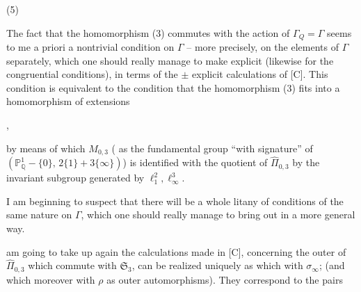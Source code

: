 \begin{samepage}
(5)\quad
{}
\end{samepage}

The fact that the homomorphism
(3) commutes with the action of $\Gamma_Q=\Gamma$
seems to me  a priori a
nontrivial condition on $\Gamma$ -- more
precisely, on the elements of
$\Gamma$ separately, which one should really
manage to make explicit (likewise for the
congruential conditions), in
terms of the $\pm$ explicit
calculations of [C]. This condition is equivalent
to the condition that the homomorphism (3) fits
into a homomorphism of extensions



,

by means of which $M_{0,3}$ ( as the fundamental group ``with signature'' of $(\mathbb P^1_{\mathbb Q}-\{0\},\,2\{1\}+3\{\infty\})$) is identified with the quotient of $\widehat{\Pi}_{0,3}$ by the invariant  subgroup generated by $\ell_1^2,\ell_\infty^3$.

I am beginning to suspect that there will be a whole litany of conditions of the same nature on $\Gamma$, which one should really manage to bring out in a more general way.


 am going to take up again the calculations made in [C], concerning the outer  of $\widehat{\Pi}_{0,3}$ which commute with $\mathfrak S_3$,   can be realized uniquely as    which  with $\sigma_\infty$; (and which moreover  with $\rho$ as outer automorphisms). They correspond  to the pairs

